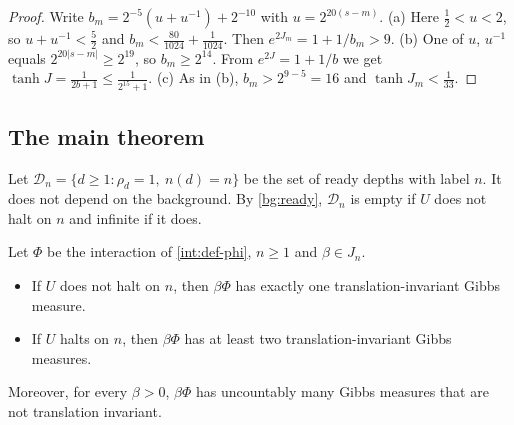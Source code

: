 \begin{proof}
Write $b_m=2^{-5}(u+u^{-1})+2^{-10}$ with $u=2^{20(s-m)}$. (a) Here $\frac12<u<2$, so $u+u^{-1}<\frac52$ and $b_m<\frac{80}{1024}+\frac1{1024}$. Then $e^{2J_m}=1+1/b_m>9$. (b) One of $u$, $u^{-1}$ equals $2^{20|s-m|}\ge2^{19}$, so $b_m\ge2^{14}$. From $e^{2J}=1+1/b$ we get $\tanh J=\frac{1}{2b+1}\le\frac1{2^{15}+1}$. (c) As in (b), $b_m>2^{9-5}=16$ and $\tanh J_m<\frac1{33}$.
\end{proof}

\subsection{The main theorem}

Let $\mathcal D_n=\{d\ge1:\rho_d=1,\ n(d)=n\}$ be the set of ready depths with label $n$. It does not depend on the background. By \cref{bg:ready}, $\mathcal D_n$ is empty if $U$ does not halt on $n$ and infinite if it does.

\begin{theorem}\label{thm:main}
Let $\Phi$ be the interaction of \cref{int:def-phi}, $n\ge1$ and $\beta\in J_n$.
\begin{itemize}
\item[(i)] If $U$ does not halt on $n$, then $\beta\Phi$ has exactly one translation-invariant Gibbs measure.
\item[(ii)] If $U$ halts on $n$, then $\beta\Phi$ has at least two translation-invariant Gibbs measures.
\end{itemize}
Moreover, for every $\beta>0$, $\beta\Phi$ has uncountably many Gibbs measures that are not translation invariant.
\end{theorem}

